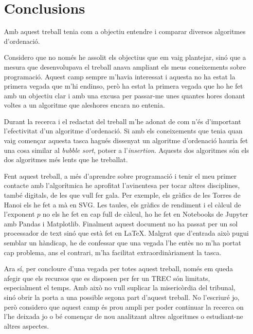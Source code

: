 \chapter{Conclusions}
Amb aquest treball tenia com a objectiu entendre i comparar diversos algoritmes d'ordenació.

Considero que no només he assolit els objectius que em vaig plantejar, sinó que a mesura que desenvolupava el treball anava ampliant els meus coneixements sobre programació. Aquest camp sempre m'havia interessat i aquesta no ha estat la primera vegada que m'hi endinso, però ha estat la primera vegada que ho he fet amb un objectiu clar i amb una excusa per passar-me unes quantes hores donant voltes a un algoritme que aleshores encara no entenia.

Durant la recerca i el redactat del treball m'he adonat de com n'és d'important l'efectivitat d'un algoritme d'ordenació.
Si amb els coneixements que tenia quan vaig començar aquesta tasca hagués dissenyat un algoritme d'ordenació hauria fet una cosa similar al \textit{bubble sort}, potser a l'\textit{insertion}. Aquests dos algoritmes són els dos algoritmes més lents que he treballat.

Fent aquest treball, a més d'aprendre sobre programació i tenir el meu primer contacte amb l'algorítmica he aprofitat l'avinentesa per tocar altres disciplines, també digitals, de les que vull fer gala.
Per exemple, els gràfics de les Torres de Hanoi els he fet a mà en SVG.
Les taules, els gràfics de rendiment i el càlcul de l'exponent $p$ no els he fet en cap full de càlcul, ho he fet en Notebooks de Jupyter amb Pandas i Matplotlib.
Finalment aquest document no ha passat per un sol processador de text sinó que està fet en \LaTeX. Malgrat que d'entrada això pugui semblar un hàndicap, he de confessar que una vegada l'he entès no m'ha portat cap problema, ans el contrari, m'ha facilitat extraordinàriament la tasca.

Ara sí, per concloure d'una vegada per totes aquest treball, només em queda afegir que els recursos que es disposen per fer un TREC són limitats, especialment el temps.
Amb això no vull suplicar la misericòrdia del tribunal, sinó obrir la porta a una possible segona part d'aquest treball.
No l'escriuré jo, però considero que aquest camp és prou ampli per poder continuar la recerca on l'he deixada jo o bé començar de nou analitzant altres algoritmes o estudiant-ne altres aspectes.